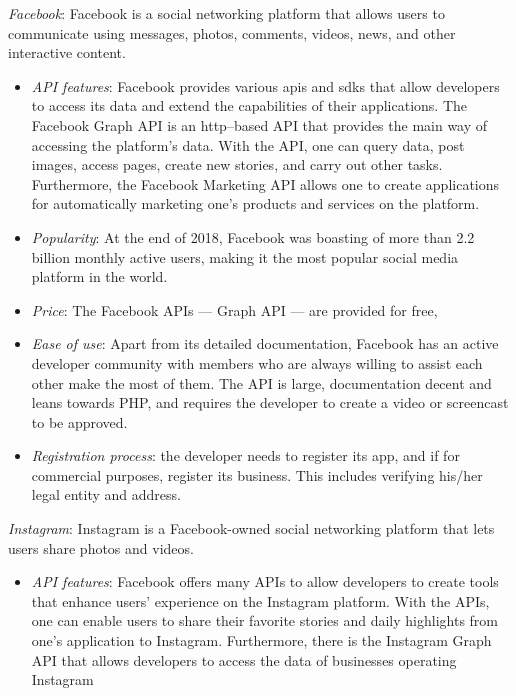 \begin{enum-c}
\item \emph{Facebook}:
  Facebook is a social networking platform that allows users to communicate
  using messages, photos, comments, videos, news, and other interactive content.
  \begin{itemize}
  \item \emph{API features}:
    Facebook provides various \glspl{api} and \glspl{sdk} that allow developers to access its
    data and extend the capabilities of their applications. The Facebook Graph
    API is an \gls{http}--based API that provides the main way of accessing the
    platform's data. With the API, one can query data, post images, access
    pages, create new stories, and carry out other tasks. Furthermore, the
    Facebook Marketing API allows one to create applications for automatically
    marketing one's products and services on the platform.
  \item \emph{Popularity}:
    At the end of 2018, Facebook was boasting of more than 2.2
    billion monthly active users, making it the most popular social media
    platform in the world.
  \item \emph{Price}:
    The Facebook APIs --- Graph API --- are provided for free,
  \item \emph{Ease of use}:
    Apart from its detailed documentation, Facebook has an active
developer community with members who are always willing to assist each other
make the most of them. The API is large, documentation decent and leans towards
PHP, and requires the developer to create a video or screencast to be approved.
\item \emph{Registration process}: the developer needs to register its app, and if for
  commercial purposes, register its business. This includes verifying his/her legal entity and address.
  \end{itemize}
%
\item \emph{Instagram}:
Instagram is a Facebook-owned social networking platform that lets users share
photos and videos.
%
\begin{itemize}
\item \emph{API features}:
  Facebook offers many APIs to allow developers to create tools that enhance
  users' experience on the Instagram platform. With the APIs, one can enable
  users to share their favorite stories and daily highlights from one's
  application to Instagram. Furthermore, there is the Instagram Graph API that
  allows developers to access the data of businesses operating Instagram

\end{itemize}
\end{enum-c}
